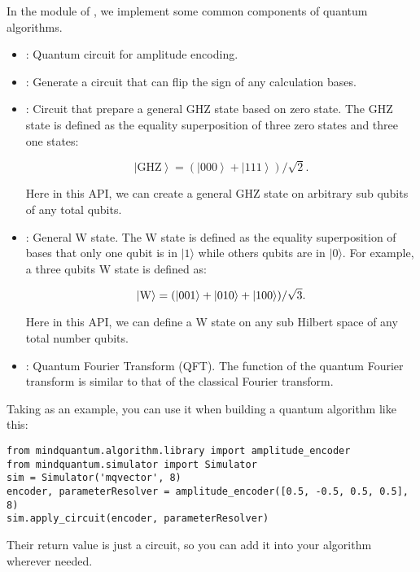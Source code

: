 In the \library module of \MindQuantum, we implement some common components of quantum algorithms.

\begin{itemize}

    \item \amplitudeencoder: Quantum circuit for amplitude encoding.

    \item \bitphaseflipoperator: Generate a circuit that can flip the sign of any calculation bases.

    \item \generalghzstate: Circuit that prepare a general GHZ state based on zero state. The GHZ state is defined as the equality superposition of three zero states and three one states:

          \begin{equation}
              \left|\text{GHZ}\right> = (\left|000\right> + \left|111\right>)/\sqrt{2}.
          \end{equation}

          Here in this API, we can create a general GHZ state on arbitrary sub qubits of any total qubits.

    \item \generalwstate: General W state. The W state is defined as the equality superposition of bases that only one qubit is in $|1\rangle$
          while others qubits are in $|0\rangle$. For example, a three qubits W state is defined as:

          \begin{equation}
              \left|\rm W\right> = (\left|001\right> + \left|010\right> + \left|100\right>)/\sqrt{3}.
          \end{equation}

          Here in this API, we can define a W state on any sub Hilbert space of any total number qubits.

    \item \qft: Quantum Fourier Transform (QFT). The function of the quantum Fourier transform is similar to that of the classical Fourier transform.
\end{itemize}

Taking \amplitudeencoder as an example, you can use it when building a quantum algorithm like this:
\begin{lstlisting}
from mindquantum.algorithm.library import amplitude_encoder
from mindquantum.simulator import Simulator
sim = Simulator('mqvector', 8)
encoder, parameterResolver = amplitude_encoder([0.5, -0.5, 0.5, 0.5], 8)
sim.apply_circuit(encoder, parameterResolver)
\end{lstlisting}
Their return value is just a circuit, so you can add it into your algorithm wherever needed.